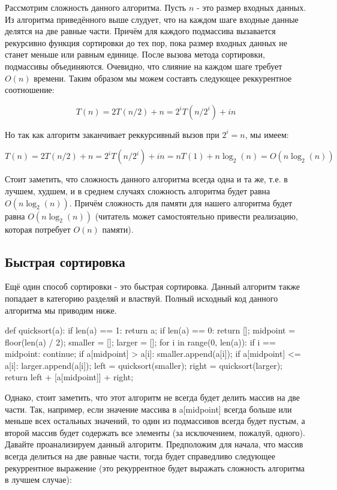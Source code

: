 Рассмотрим сложность данного алгоритма. Пусть $n$ - это размер входных 
данных. Из алгоритма приведённого выше слудует, что на каждом шаге 
входные данные делятся на две равные части. Причём для каждого подмассива
вызавается рекурсивно функция сортировки до тех пор, пока размер входных
данных не станет меньше или равным единице. После вызова метода сортировки, подмассивы 
объединяются. Очевидно, что слияние на каждом шаге требует $O(n)$ времени.
Таким образом мы можем составть следующее реккурентное соотношение:

$$T(n) = 2T(n/2) + n = 2^iT(n/2^i)+in$$

Но так как алгоритм заканчивает реккурсивный вызов при $2^i=n$, мы имеем:

$$T(n) = 2T(n/2) + n = 2^iT(n/2^i)+in = nT(1)+n\log_2(n) = O(n\log_2(n))$$

Стоит заметить, что сложность данного алгоритма всегда одна и та же, т.е. 
в лучшем, худшем, и в среднем случаях сложность алгоритма будет равна
$O(n\log_2(n))$. Причём сложность для памяти для нашего алгоритма будет равна $O(n\log_2(n))$
(читатель может самостоятельно привести реализацию, которая потребует $O(n)$ памяти).

\subsection{Быстрая сортировка}

Ещё один способ сортировки - это быстрая сортировка. Данный алгоритм также попадает 
в категорию разделяй и властвуй. Полный исходный код данного алгоритма мы приводим 
ниже. 

\begin{python}
def quicksort(a):
	if len(a) == 1:
		return a;
	if len(a) == 0:
		return [];
	midpoint = floor(len(a) / 2);
	smaller = [];
	larger  = [];
	for i in range(0, len(a)):
		if i == midpoint:
			continue;
		if a[midpoint] > a[i]:
			smaller.append(a[i]);
		if a[midpoint] <= a[i]:
			larger.append(a[i]);
	left = quicksort(smaller);
	right = quicksort(larger);
	return left + [a[midpoint]] + right;
\end{python}

Однако, стоит заметить, что этот алгоритм не всегда будет делить массив на две части.
Так, например, если значение массива в a[midpoint] всегда больше или меньше всех остальных 
значений, то один из подмассивов всегда будет пустым, а второй массив будет содержать все 
элементы (за исключением, пожалуй, одного). Давайте проанализируем данный алгоритм. 
Предположим для начала, что массив всегда делиться на две равные части, тогда будет 
справедливо следующее рекуррентное выражение (это рекуррентное будет выражать 
сложность алгоритма в лучшем случае):

